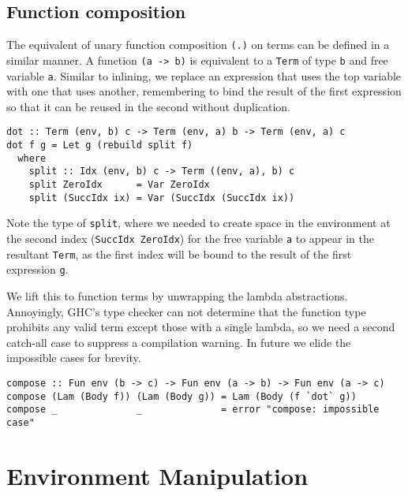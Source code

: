 
\subsection{Function composition}

The equivalent of unary function composition \texttt{(.)} on terms can be
defined in a similar manner. A function \lstinline[style=inline]{(a -> b)} is
equivalent to a \texttt{Term} of type \texttt{b} and free variable \texttt{a}.
Similar to inlining, we replace an expression that uses the top variable with
one that uses another, remembering to bind the result of the first expression so
that it can be reused in the second without duplication.
%
\begin{lstlisting}[style=haskell]
dot :: Term (env, b) c -> Term (env, a) b -> Term (env, a) c
dot f g = Let g (rebuild split f)
  where
    split :: Idx (env, b) c -> Term ((env, a), b) c
    split ZeroIdx      = Var ZeroIdx
    split (SuccIdx ix) = Var (SuccIdx (SuccIdx ix))
\end{lstlisting}
%
Note the type of \texttt{split}, where we needed to create space in the
environment at the second index (\texttt{SuccIdx ZeroIdx}) for the free variable
\texttt{a} to appear in the resultant \texttt{Term}, as the first index will be
bound to the result of the first expression \texttt{g}.

We lift this to function terms by unwrapping the lambda abstractions.
Annoyingly, GHC's type checker can not determine that the function type
prohibits any valid term except those with a single lambda, so we need a second
catch-all case to suppress a compilation warning. In future we elide the
impossible cases for brevity.
%
\begin{lstlisting}[style=haskell,firstnumber=last,caption={A simultaneous substitution to compose unary function terms}]
compose :: Fun env (b -> c) -> Fun env (a -> b) -> Fun env (a -> c)
compose (Lam (Body f)) (Lam (Body g)) = Lam (Body (f `dot` g))
compose _              _              = error "compose: impossible case"
\end{lstlisting}


\section{Environment Manipulation}
\label{sec:environment_manipulation}


